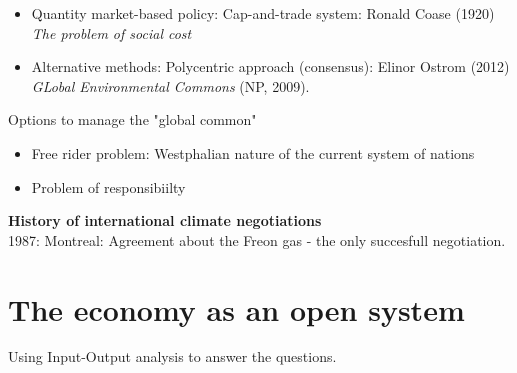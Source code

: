 \begin{multicols}{2}
\begin{itemize}
\begin{itemize}
         \item Quantity market-based policy: Cap-and-trade system: Ronald Coase (1920) \textit{The problem of social cost}
         \item Alternative methods: Polycentric approach (consensus): Elinor Ostrom (2012) \textit{GLobal Environmental Commons} (NP, 2009).
        \end{itemize}
        Options to manage the "global common"
        \begin{itemize}
         \item Free rider problem: Westphalian nature of the current system of nations
         \item Problem of responsibiilty
        \end{itemize}
 \end{itemize}
 \textbf{History of international climate negotiations}\\
 1987: Montreal: Agreement about the Freon gas - the only succesfull negotiation.
\end{multicols}


\section{The economy as an open system}  %
Using Input-Output analysis to answer the questions.
